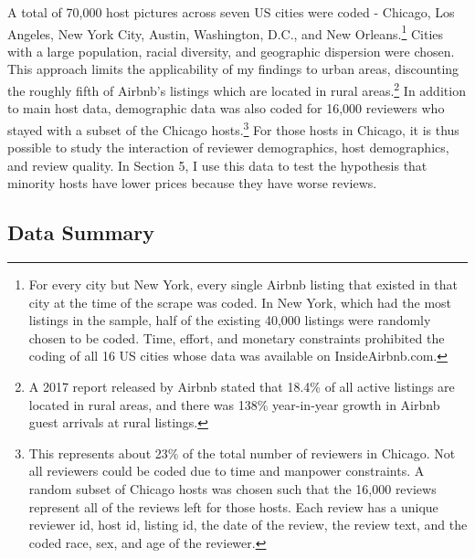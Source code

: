A total of 70,000 host pictures across seven US cities were coded - Chicago, Los Angeles, New York City, Austin, Washington, D.C., and New Orleans.\footnote{For every city but New York, every single Airbnb listing that existed in that city at the time of the scrape was coded. In New York, which had the most listings in the sample, half of the existing 40,000 listings were randomly chosen to be coded. Time, effort, and monetary constraints prohibited the coding of all 16 US cities whose data was available on InsideAirbnb.com.} Cities with a large population, racial diversity, and geographic dispersion were chosen. This approach limits the applicability of my findings to urban areas, discounting the roughly fifth of Airbnb's listings which are located in rural areas.\footnote{A 2017 report released by Airbnb stated that 18.4\% of all active listings are located in rural areas, and there was 138\% year-in-year growth in Airbnb guest arrivals at rural listings.} In addition to main host data, demographic data was also coded for 16,000 reviewers who stayed with a subset of the Chicago hosts.\footnote{This represents about 23\% of the total number of reviewers in Chicago. Not all reviewers could be coded due to time and manpower constraints. A random subset of Chicago hosts was chosen such that the 16,000 reviews represent all of the reviews left for those hosts. Each review has a unique reviewer id, host id, listing id, the date of the review, the review text, and the coded race, sex, and age of the reviewer.} For those hosts in Chicago, it is thus possible to study the interaction of reviewer demographics, host demographics, and review quality. In Section 5, I use this data to test the hypothesis that minority hosts have lower prices because they have worse reviews. 



\subsection{Data Summary} %


